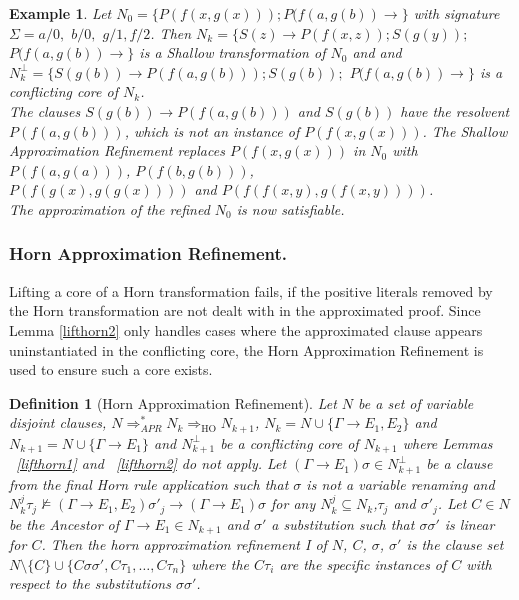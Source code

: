 \documentclass{llncs}
\newcommand{\imp}{\rightarrow}
\newcommand{\apr}{ \Rightarrow_{APR}}
\newtheorem{defin}{Definition}
\newtheorem{exmp}{Example}
\begin{document}
\begin{exmp}
Let $N_0 = \{ P(f(x,g(x))); P(f(a,g(b))\imp\}$ with signature $\Sigma = a/0,$ $b/0,$ $g/1, f/2$.
Then $N_k=  \{  S(z) \imp  P(f(x,z)); S(g(y));$ $ P(f(a,g(b))\imp\}$ is a Shallow transformation of $N_0 $ and
and $N^\bot_k=\{  S(g(b)) \imp  P(f(a,g(b))); S(g(b));$ $  P(f(a,g(b))\imp\}$ is a conflicting core of $N_k$.\\
The clauses $S(g(b)) \imp  P(f(a,g(b)))$ and $ S(g(b))$ have the resolvent $P(f(a,g(b)))$, which is not an instance of  $P(f(x,g(x)))$.
The Shallow Approximation Refinement replaces $P(f(x,g(x)))$ in $N_0$ with $P(f(a,g(a)))$, $P(f(b,g(b)))$,\\ $P(f(g(x),g(g(x))))$ and $P(f(f(x,y),g(f(x,y))))$.\\
The approximation of the refined $N_0$ is now satisfiable. 
\end{exmp}

\subsubsection{Horn Approximation Refinement.}
Lifting a core of a Horn transformation fails, if  the positive literals removed by 
the Horn transformation are not dealt with in the approximated proof.
Since Lemma \ref{lifthorn2} only handles cases where the approximated clause appears uninstantiated in the conflicting core,
the Horn Approximation Refinement is used to ensure such a core exists. 

\begin{defin}[Horn Approximation Refinement]
Let $N$ be a set of variable disjoint clauses, 
$N\apr^* N_k \Rightarrow_{\text{HO}} N_{k+1}$,
$N_k = N\cup\{\Gamma \imp E_1,E_2\}$ and $N_{k+1} = N\cup\{\Gamma \imp E_1\}$ and
$N^\bot_{k+1}$ be a conflicting core of $N_{k+1}$ where Lemmas ~\ref{lifthorn1} and ~\ref{lifthorn2} do not apply.
Let $(\Gamma \imp E_1)\sigma \in N^\bot_{k+1}$ 
 be a clause from the final Horn rule application such that $\sigma$ is not a variable renaming and
$N_k^j\tau_j\not \models  (\Gamma \imp E_1,E_2)\sigma'_j\rightarrow (\Gamma \imp E_1)\sigma$ for any $N_k^j\subseteq N_k$,$\tau_j$ and $\sigma'_j$. 
Let $C\in N$ be the Ancestor of $\Gamma \imp E_1\in N_{k+1}$
and $\sigma'$ a substitution such that $\sigma\sigma'$ is linear for $C$.
Then the \emph{horn approximation refinement I} of $N$, $C$, $\sigma$, $\sigma'$ is the clause
set $N\setminus\{C\}\cup\{C\sigma\sigma',C\tau_1,\ldots,C\tau_n\}$ where the $C\tau_i$ are the specific
instances of $C$ with respect to the substitutions $\sigma\sigma'$.
\end{defin}
\end{document}
